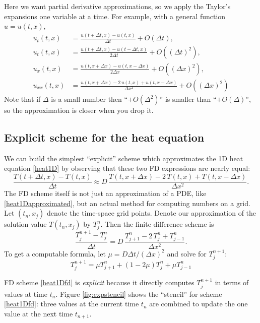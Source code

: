 \documentclass[letterpaper,final,12pt,reqno]{amsart}
\begin{document}
Here we want partial derivative approximations, so we apply the Taylor's expansions one variable at a time.  For example, with a general function $u=u(t,x)$,
\begin{align*}
u_t(t,x) &= \frac{u(t+\Delta t,x) - u(t,x)}{\Delta t} + O(\Delta t), \\
u_t(t,x) &= \frac{u(t+\Delta t,x) - u(t-\Delta t,x)}{2\Delta t} + O((\Delta t)^2), \\
u_x(t,x) &= \frac{u(t,x+\Delta x) - u(t,x-\Delta x)}{2\Delta x} + O((\Delta x)^2), \\
u_{xx}(t,x) &= \frac{u(t,x+\Delta x) - 2\, u(t,x) + u(t,x-\Delta x)}{\Delta x^2} + O((\Delta x)^2)
\end{align*}
Note that if $\Delta$ is a small number then ``$+O(\Delta^2)$'' is smaller than ``$+O(\Delta)$'', so the approximation is closer when you drop it.

\subsection*{Explicit scheme for the heat equation}  We can build the simplest ``explicit'' scheme which approximates the 1D heat equation \eqref{heat1D} by observing that these two FD expressions are nearly equal:
\begin{equation}
\frac{T(t+\Delta t,x) - T(t,x)}{\Delta t} \approx D\,\frac{T(t,x+\Delta x) - 2\, T(t,x) + T(t,x-\Delta x)}{\Delta x^2}.  \label{heat1Dapproximated}
\end{equation}
The FD scheme itself is not just an approximation of a PDE, like \eqref{heat1Dapproximated}, but an actual method for computing numbers on a grid.  Let $(t_n,x_j)$ denote the time-space grid points.  Denote our approximation of the solution value $T(t_n,x_j)$ by $T_j^n$.  Then the finite difference scheme is
	$$\frac{T_j^{n+1} - T_j^n}{\Delta t} = D\,\frac{T_{j+1}^n - 2\, T_j^n + T_{j-1}^n}{\Delta x^2}.$$
To get a computable formula, let $\mu = D \Delta t / (\Delta x)^2$ and solve for $T_j^{n+1}$:
\begin{equation}
  T_j^{n+1} = \mu T_{j+1}^n + (1 - 2 \mu) T_j^n + \mu T_{j-1}^n \label{heat1Dfd}
\end{equation}

FD scheme \eqref{heat1Dfd} is \emph{explicit} because it directly computes $T_j^{n+1}$ in terms of values at time $t_n$.  Figure \ref{fig:expstencil} shows the ``stencil'' for scheme \eqref{heat1Dfd}: three values at the current time $t_n$ are combined to update the one value at the next time $t_{n+1}$.
\end{document}
